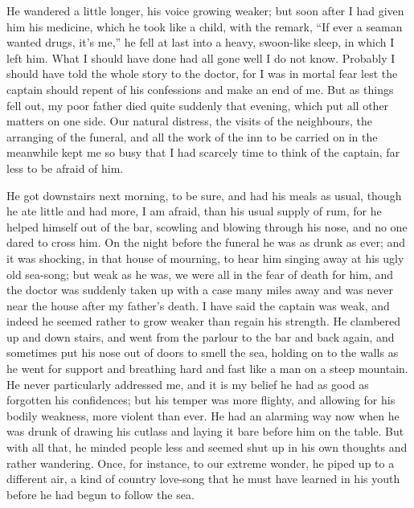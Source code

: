 He wandered a little longer, his voice growing weaker; but soon after I had given him his medicine, which he took like a child, with the remark, \enquote{If ever a seaman wanted drugs, it’s me,} he fell at last into a heavy, swoon-like sleep, in which I left him. What I should have done had all gone well I do not know. Probably I should have told the whole story to the doctor, for I was in mortal fear lest the captain should repent of his confessions and make an end of me. But as things fell out, my poor father died quite suddenly that evening, which put all other matters on one side. Our natural distress, the visits of the neighbours, the arranging of the funeral, and all the work of the inn to be carried on in the meanwhile kept me so busy that I had scarcely time to think of the captain, far less to be afraid of him.

He got downstairs next morning, to be sure, and had his meals as usual, though he ate little and had more, I am afraid, than his usual supply of rum, for he helped himself out of the bar, scowling and blowing through his nose, and no one dared to cross him. On the night before the funeral he was as drunk as ever; and it was shocking, in that house of mourning, to hear him singing away at his ugly old sea-song; but weak as he was, we were all in the fear of death for him, and the doctor was suddenly taken up with a case many miles away and was never near the house after my father’s death. I have said the captain was weak, and indeed he seemed rather to grow weaker than regain his strength. He clambered up and down stairs, and went from the parlour to the bar and back again, and sometimes put his nose out of doors to smell the sea, holding on to the walls as he went for support and breathing hard and fast like a man on a steep mountain. He never particularly addressed me, and it is my belief he had as good as forgotten his confidences; but his temper was more flighty, and allowing for his bodily weakness, more violent than ever. He had an alarming way now when he was drunk of drawing his cutlass and laying it bare before him on the table. But with all that, he minded people less and seemed shut up in his own thoughts and rather wandering. Once, for instance, to our extreme wonder, he piped up to a different air, a kind of country love-song that he must have learned in his youth before he had begun to follow the sea.

